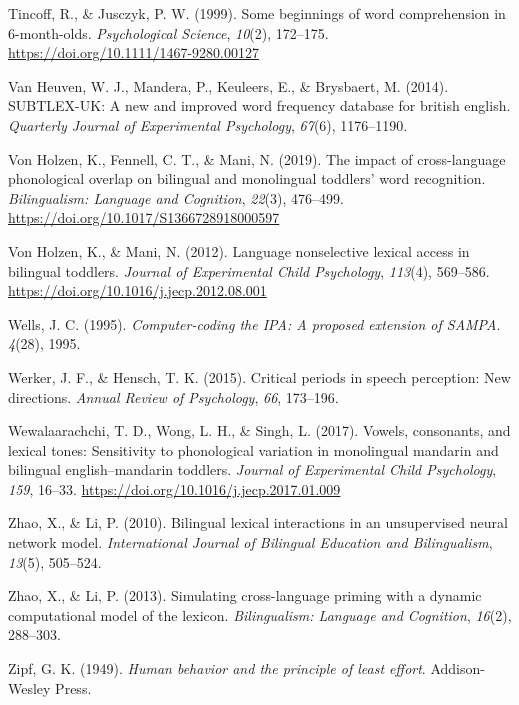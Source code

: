 \documentclass[
]{article}
\newlength{\cslhangindent}
\newlength{\cslentryspacingunit} %
\newenvironment{CSLReferences}[2] %
 {%
  \setlength{\parindent}{0pt}
  \ifodd #1
  \let\oldpar\par
  \def\par{\hangindent=\cslhangindent\oldpar}
  \fi
  \setlength{\parskip}{#2\cslentryspacingunit}
 }%
 {}
\begin{document}
\begin{CSLReferences}{1}{0}
\leavevmode{}%
Tincoff, R., \& Jusczyk, P. W. (1999). Some beginnings of word
comprehension in 6-month-olds. \emph{Psychological Science},
\emph{10}(2), 172--175. \url{https://doi.org/10.1111/1467-9280.00127}

\leavevmode{}%
Van Heuven, W. J., Mandera, P., Keuleers, E., \& Brysbaert, M. (2014).
{SUBTLEX}-{UK}: A new and improved word frequency database for british
english. \emph{Quarterly Journal of Experimental Psychology},
\emph{67}(6), 1176--1190.

\leavevmode{}%
Von Holzen, K., Fennell, C. T., \& Mani, N. (2019). The impact of
cross-language phonological overlap on bilingual and monolingual
toddlers' word recognition. \emph{Bilingualism: Language and Cognition},
\emph{22}(3), 476--499. \url{https://doi.org/10.1017/S1366728918000597}

\leavevmode{}%
Von Holzen, K., \& Mani, N. (2012). Language nonselective lexical access
in bilingual toddlers. \emph{Journal of Experimental Child Psychology},
\emph{113}(4), 569--586.
\url{https://doi.org/10.1016/j.jecp.2012.08.001}

\leavevmode{}%
Wells, J. C. (1995). \emph{Computer-coding the {IPA}: A proposed
extension of {SAMPA}}. \emph{4}(28), 1995.

\leavevmode{}%
Werker, J. F., \& Hensch, T. K. (2015). Critical periods in speech
perception: New directions. \emph{Annual Review of Psychology},
\emph{66}, 173--196.

\leavevmode{}%
Wewalaarachchi, T. D., Wong, L. H., \& Singh, L. (2017). Vowels,
consonants, and lexical tones: Sensitivity to phonological variation in
monolingual mandarin and bilingual english--mandarin toddlers.
\emph{Journal of Experimental Child Psychology}, \emph{159}, 16--33.
\url{https://doi.org/10.1016/j.jecp.2017.01.009}

\leavevmode{}%
Zhao, X., \& Li, P. (2010). Bilingual lexical interactions in an
unsupervised neural network model. \emph{International Journal of
Bilingual Education and Bilingualism}, \emph{13}(5), 505--524.

\leavevmode{}%
Zhao, X., \& Li, P. (2013). Simulating cross-language priming with a
dynamic computational model of the lexicon. \emph{Bilingualism: Language
and Cognition}, \emph{16}(2), 288--303.

\leavevmode{}%
Zipf, G. K. (1949). \emph{Human behavior and the principle of least
effort}. Addison-Wesley Press.

\end{CSLReferences}
\end{document}
